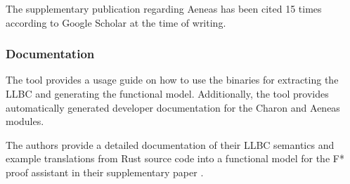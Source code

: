 The supplementary publication regarding Aeneas \cite{ho_aeneas_2022} has been cited 15 times according to Google Scholar at the time of writing.

\subsubsection{Documentation}

 The tool provides a usage guide \cite{aeneasverif_aeneasverifaeneas_2023} on how to use the binaries for extracting the LLBC and generating the functional model. Additionally, the tool provides automatically generated developer documentation for the Charon \cite{aeneasverif_aeneasverifcharon_2023} and Aeneas \cite{aeneasverif_aeneasverifaeneas_2023} modules.

The authors provide a detailed documentation of their LLBC semantics and example translations from Rust source code into a functional model for the F* proof assistant in their supplementary paper \cite{ho_aeneas_2022}.